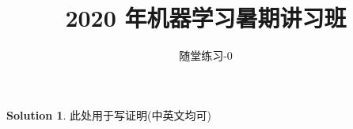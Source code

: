 \documentclass[a4paper,UTF8]{article}
\theoremstyle{definition}
\newtheorem*{solution}{Solution}
\begin{document}
\title{2020 年机器学习暑期讲习班}
\author{\Large 随堂练习-0}
\maketitle

\begin{solution}
此处用于写证明(中英文均可)
~\\
~\\
~\\
\end{solution}
\end{document}
